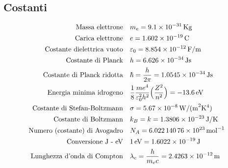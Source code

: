 \subsection{Costanti}
\begin{equation}
\begin{split}
\mbox{Massa elettrone} & \quad m_e = \SI{9.1e-31}{Kg} \\
\mbox{Carica elettrone} & \quad e = \SI{1.602e-19}{C} \\
\mbox{Costante dielettrica vuoto} & \quad \varepsilon_0 = \SI{8.854e-12}{F/m} \\
\mbox{Costante di Planck} & \quad h = \SI{6.626e-34}{J s} \\
\mbox{Costante di Planck ridotta} & \quad \hbar = \frac{ h}{2\pi } = \SI{1.0545e-34}{J s} \\
\mbox{Energia minima idrogeno} & \quad \frac{ 1}{8 }\frac{m e^4 }{\varepsilon_0^2 h^2 } \Bigl(  \frac{ Z^2}{n^2 }  \Bigr)= \SI{-13.6e0}{eV} \\
\mbox{Costante di Stefan-Boltzmann} & \quad \sigma = \SI{5.67e-8}{W / ( m^2 K^4)} \\
\mbox{Costante di Boltzmann} & \quad k_B = k = \SI{1.3806e-23}{J / K} \\
\mbox{Numero (costante) di Avogadro} & \quad N_A = \SI{6.02214076e23}{mol^{-1}} \\
\mbox{Conversione J - eV} & \quad \SI{1 }{eV} = \SI{1.6022e-19}{J} \\
\mbox{Lunghezza d'onda di Compton} & \quad \lambda_c = \frac{ h}{m_e c } = \SI{2.4263e-12}{m} \\
\end{split}
\end{equation}

